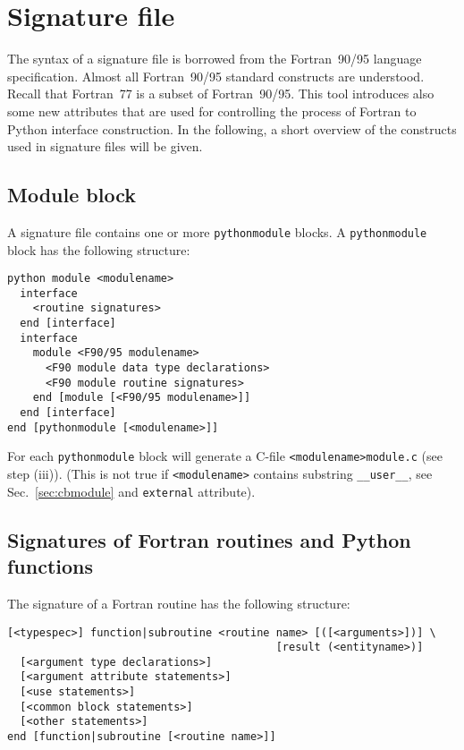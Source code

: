 
\section{Signature file}
\label{sec:signaturefile}

The syntax of a signature file is borrowed from the Fortran~90/95
language specification. Almost all Fortran~90/95 standard constructs
are understood. Recall that Fortran~77 is a subset of Fortran~90/95.
This tool introduces also some new attributes that are used for
controlling the process of Fortran to Python interface construction.
In the following, a short overview of the constructs
used in signature files will be given.


\subsection{Module block}
\label{sec:moduleblock}

A signature file contains one or more \texttt{pythonmodule} blocks. A
\texttt{pythonmodule} block has the following structure:
\begin{verbatim}
python module <modulename>
  interface
    <routine signatures>
  end [interface]
  interface
    module <F90/95 modulename>
      <F90 module data type declarations>
      <F90 module routine signatures>
    end [module [<F90/95 modulename>]]
  end [interface]
end [pythonmodule [<modulename>]]
\end{verbatim}
For each \texttt{pythonmodule} block \fpy will generate a C-file
\texttt{<modulename>module.c} (see step (iii)).  (This is not true if
\texttt{<modulename>} contains substring \texttt{\_\_user\_\_}, see
Sec.~\ref{sec:cbmodule} and \texttt{external} attribute).

\subsection{Signatures of Fortran routines and Python functions}
\label{sec:routineblock}


The signature of a Fortran routine has the following structure:
\begin{verbatim}
[<typespec>] function|subroutine <routine name> [([<arguments>])] \
                                          [result (<entityname>)]
  [<argument type declarations>]
  [<argument attribute statements>]
  [<use statements>]
  [<common block statements>]
  [<other statements>]
end [function|subroutine [<routine name>]]
\end{verbatim}

